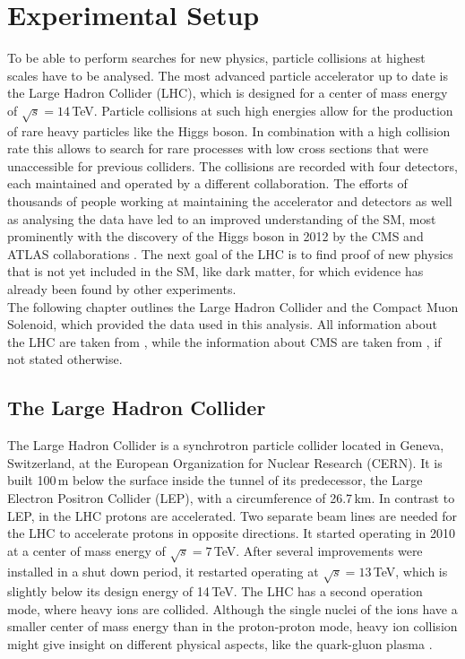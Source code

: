 \chapter{Experimental Setup}
\label{chap:expsetup}
To be able to perform searches for new physics, particle collisions at highest scales have to be analysed. The most advanced particle accelerator up to date is the Large Hadron Collider (LHC), which is designed for a center of mass energy of $\sqrt{s}= 14$\,TeV. Particle collisions at such high energies allow for the production of rare heavy particles like the Higgs boson. In combination with a high collision rate this allows to search for rare processes with low cross sections that were unaccessible for previous colliders. The collisions are recorded with four detectors, each maintained and operated by a different collaboration. The efforts of thousands of people working at maintaining the accelerator and detectors as well as analysing the data have led to an improved understanding of the SM, most prominently with the discovery of the Higgs boson in 2012 by the CMS \cite{cms_higgsdiscov} and ATLAS collaborations \cite{atlas_higgsdiscov}. The next goal of the LHC is to find proof of new physics that is not yet included in the SM, like dark matter, for which evidence has already been found by other experiments.\\

\noindent The following chapter outlines the Large Hadron Collider and the Compact Muon Solenoid, which provided the data used in this analysis. All information about the LHC are taken from \cite{lhc_machine}, while the information about CMS are taken from \cite{CMS_design,strip_fig}, if not stated otherwise.

\section{The Large Hadron Collider}
The Large Hadron Collider is a synchrotron particle collider located in Geneva, Switzerland, at the European Organization for Nuclear Research (CERN). It is built 100\,m below the surface inside the tunnel of its predecessor, the Large Electron Positron Collider (LEP), with a circumference of 26.7\,km. In contrast to LEP, in the LHC protons are accelerated. Two separate beam lines are needed for the LHC to accelerate protons in opposite directions. It started operating in 2010 at a center of mass energy of $\sqrt{s}=7$\,TeV. After several improvements were installed in a shut down period, it restarted operating at $\sqrt{s}=13$\,TeV, which is slightly below its design energy of 14\,TeV. The LHC has a second operation mode, where heavy ions are collided. Although the single nuclei of the ions have a smaller center of mass energy than in the proton-proton mode, heavy ion collision might give insight on different physical aspects, like the quark-gluon plasma \cite{quarkgluonplasma}.\\

